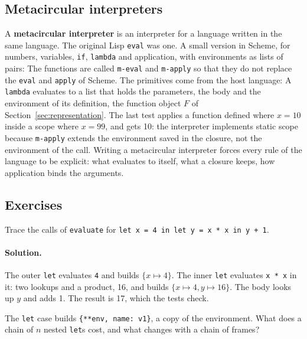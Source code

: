 \subsection{Metacircular interpreters}

A \textbf{metacircular interpreter} is an interpreter for a language written in
the same language. The original Lisp \texttt{eval} was one. A small version in
Scheme, for numbers, variables, \texttt{if}, \texttt{lambda} and application,
with environments as lists of pairs:
The functions are called \texttt{m-eval} and \texttt{m-apply} so that they do
not replace the \texttt{eval} and \texttt{apply} of Scheme. The primitives come
from the host language:
A \texttt{lambda} evaluates to a list that holds the parameters, the body and
the environment of its definition, the function object $F$ of
Section~\ref{sec:representation}. The last test applies a function defined
where $x = 10$ inside a scope where $x = 99$, and gets 10: the interpreter
implements static scope because \texttt{m-apply} extends the environment saved
in the closure, not the environment of the call. Writing a metacircular
interpreter forces every rule of the language to be explicit: what evaluates
to itself, what a closure keeps, how application binds the arguments.

\subsection{Exercises}

\begin{exercise}
Trace the calls of \texttt{evaluate} for \texttt{let x = 4 in let y = x * x in y + 1}.
\end{exercise}

\paragraph{Solution.} The outer \texttt{let} evaluates \texttt{4} and builds
$\{x \mapsto 4\}$. The inner \texttt{let} evaluates \texttt{x * x} in it: two
lookups and a product, 16, and builds $\{x \mapsto 4, y \mapsto 16\}$. The body
looks up $y$ and adds 1. The result is 17, which the tests check.

\begin{exercise}
The \texttt{let} case builds \texttt{\{**env, name: v1\}}, a copy of the
environment. What does a chain of $n$ nested \texttt{let}s cost, and what
changes with a chain of frames?
\end{exercise}

